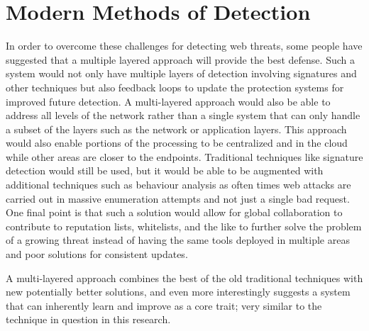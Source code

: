 \section{Modern Methods of Detection}

In order to overcome these challenges for detecting web threats, some people have suggested that a multiple layered approach will provide the best defense.  Such a system would not only have multiple layers of detection involving signatures and other techniques but also feedback loops to update the protection systems for improved future detection.  A multi-layered approach would also be able to address all levels of the network rather than a single system that can only handle a subset of the layers such as the network or application layers.  This approach would also enable portions of the processing to be centralized and in the cloud while other areas are closer to the endpoints.  Traditional techniques like signature detection would still be used, but it would be able to be augmented with additional techniques such as behaviour analysis as often times web attacks are carried out in massive enumeration attempts and not just a single bad request.  One final point is that such a solution would allow for global collaboration to contribute to reputation lists, whitelists, and the like to further solve the problem of a growing threat instead of having the same tools deployed in multiple areas and poor solutions for consistent updates. \cite{trendMicro}

A multi-layered approach combines the best of the old traditional techniques with new potentially better solutions, and even more interestingly suggests a system that can inherently learn and improve as a core trait; very similar to the technique in question in this research.








